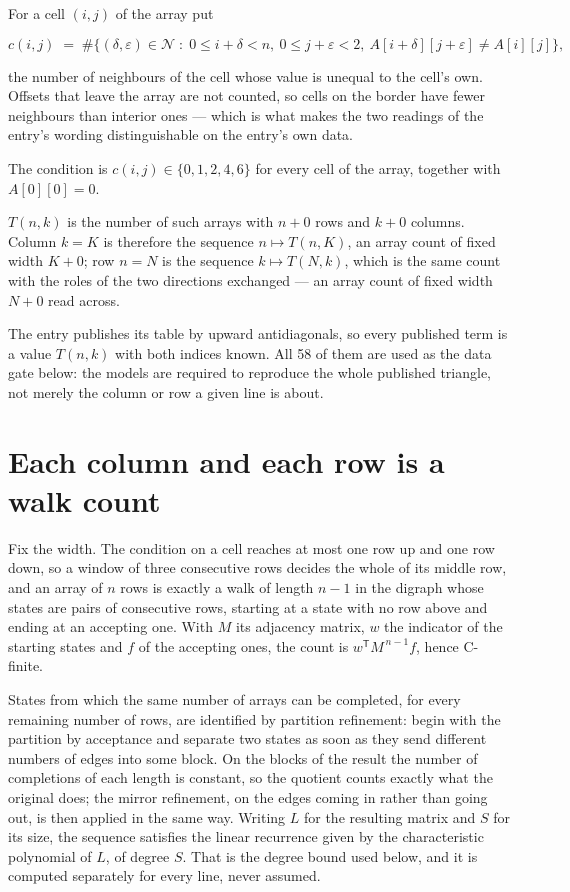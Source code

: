 \documentclass[11pt]{article}
\theoremstyle{definition}
\begin{document}
For a cell $(i,j)$ of the array put

\[c(i,j) \;=\; \#\bigl\{(\delta,\varepsilon)\in\mathcal{N} \;:\; 0\le i+\delta<n,\ 0\le j+\varepsilon<2,\ A[i+\delta][j+\varepsilon] \neq A[i][j]\bigr\},\]

the number of neighbours of the cell whose value is unequal to the cell's own. Offsets that leave the array are not counted, so cells on the border have fewer neighbours than interior ones --- which is what makes the two readings of the entry's wording distinguishable on the entry's own data.

The condition is $c(i,j) \in \{0, 1, 2, 4, 6\}$ for every cell of the array, together with $A[0][0]=0$.

$T(n,k)$ is the number of such arrays with $n + 0$ rows and $k + 0$ columns. Column $k = K$ is therefore the sequence $n \mapsto T(n,K)$, an array count of fixed width $K + 0$; row $n = N$ is the sequence $k \mapsto T(N,k)$, which is the same count with the roles of the two directions exchanged --- an array count of fixed width $N + 0$ read across.

The entry publishes its table by upward antidiagonals, so every published term is a value $T(n,k)$ with both indices known. All 58 of them are used as the data gate below: the models are required to reproduce the whole published triangle, not merely the column or row a given line is about.

\section{Each column and each row is a walk count}

Fix the width. The condition on a cell reaches at most one row up and one row down, so a window of three consecutive rows decides the whole of its middle row, and an array of $n$ rows is exactly a walk of length $n-1$ in the digraph whose states are pairs of consecutive rows, starting at a state with no row above and ending at an accepting one. With $M$ its adjacency matrix, $w$ the indicator of the starting states and $f$ of the accepting ones, the count is $w^{\mathsf T}M^{\,n-1}f$, hence C-finite.

States from which the same number of arrays can be completed, for every remaining number of rows, are identified by partition refinement: begin with the partition by acceptance and separate two states as soon as they send different numbers of edges into some block. On the blocks of the result the number of completions of each length is constant, so the quotient counts exactly what the original does; the mirror refinement, on the edges coming in rather than going out, is then applied in the same way. Writing $L$ for the resulting matrix and $S$ for its size, the sequence satisfies the linear recurrence given by the characteristic polynomial of $L$, of degree $S$. That is the degree bound used below, and it is computed separately for every line, never assumed.
\end{document}

